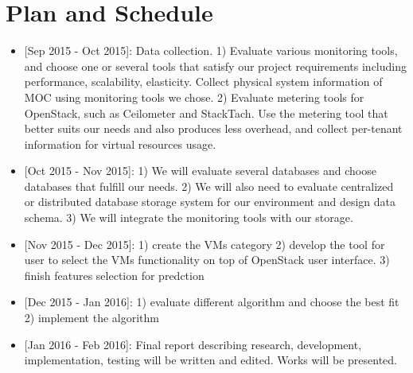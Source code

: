 \section{Plan and Schedule}
\label{sec:Plan}

\begin{itemize}
\item{[Sep 2015 - Oct 2015]:} Data collection. 1) Evaluate various monitoring tools, and choose one or several tools that satisfy our project requirements including performance, scalability, elasticity. Collect physical system information of MOC using monitoring tools we chose. 2) Evaluate metering tools for OpenStack, such as Ceilometer and StackTach. Use the metering tool that better suits our needs and also produces less overhead, and collect per-tenant information for virtual resources usage.
\item{[Oct 2015 - Nov 2015]:} 1) We will evaluate several databases and choose databases that fulfill our needs. 2) We will also need to evaluate centralized or distributed database storage system for our environment and design data schema. 3) We will integrate the monitoring tools with our storage.
\item{[Nov 2015 - Dec 2015]:} 1) create the VMs category 2) develop the tool for user to select the VMs functionality on top of OpenStack user interface. 3) finish features selection for predction
\item{[Dec 2015 - Jan 2016]:} 1) evaluate different algorithm and choose the best fit 2) implement the algorithm
\item{[Jan 2016 - Feb 2016]:} Final report describing research, development, implementation, testing will be written and edited. Works will be presented.
\end{itemize}
